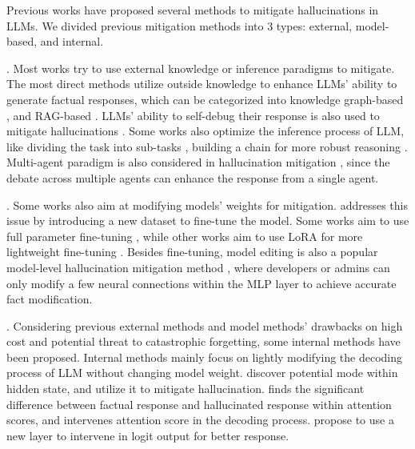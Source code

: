 Previous works have proposed several methods to mitigate hallucinations in LLMs.
We divided previous mitigation methods into 3 types: external, model-based, and internal.

.
Most works try to use external knowledge or inference paradigms to mitigate.
The most direct methods utilize outside knowledge to enhance LLMs' ability to generate factual responses, which can be categorized into knowledge graph-based \cite{sun2024thinkongraph, luo2024reasoning}, and RAG-based \cite{li2024chainofknowledge, tian2024finetuning}.
LLMs' ability to self-debug their response is also used to mitigate hallucinations \cite{chen2024teaching, gou2024critic}.
Some works also optimize the inference process of LLM, like dividing the task into sub-tasks \cite{pan2023fact}, building a chain for more robust reasoning \cite{luo2024reasoning, li2024chainofknowledge}.
Multi-agent paradigm is also considered in hallucination mitigation \cite{hong2024metagpt}, since the debate across multiple agents can enhance the response from a single agent.

.
Some works also aim at modifying models' weights for mitigation.
\cite{liu2024mitigating, li2024chainofknowledge, tian2024finetuning} addresses this issue by introducing a new dataset to fine-tune the model.
Some works aim to use full parameter fine-tuning \cite{tian2024finetuning}, while other works aim to use LoRA for more lightweight fine-tuning \cite{liu2024mitigating, li2024chainofknowledge}.
Besides fine-tuning, model editing is also a popular model-level hallucination mitigation method \cite{meng2023locating}, where developers or admins can only modify a few neural connections within the MLP layer to achieve accurate fact modification.

.
Considering previous external methods and model methods' drawbacks on high cost and potential threat to catastrophic forgetting, some internal methods have been proposed.
Internal methods mainly focus on lightly modifying the decoding process of LLM without changing model weight.
\cite{azaria2023internal, chen2024context} discover potential mode within hidden state, and utilize it to mitigate hallucination.
\cite{chuang2024lookback} finds the significant difference between factual response and hallucinated response within attention scores, and intervenes attention score in the decoding process.
\cite{liu2024litcab} propose to use a new layer to intervene in logit output for better response.